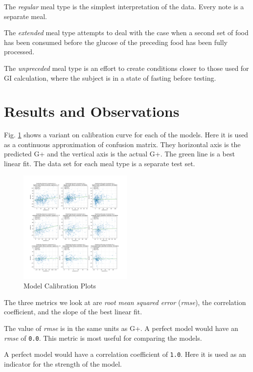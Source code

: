 \documentclass[conference]{IEEEtran}
\begin{document}
The \emph{regular} meal type is the simplest interpretation of the data. Every note is a separate meal.

The \emph{extended} meal type attempts to deal with the case when a second set of food has been consumed before the glucose of the preceding food has been fully processed.

The \emph{unpreceded} meal type is an effort to create conditions closer to those used for GI calculation, where the subject is in a state of fasting before testing.

\section{Results and Observations}

Fig. \ref{fig:all_models_tested} shows a variant on calibration curve for each of the models. Here it is used as a continuous approximation of confusion matrix. They horizontal axis is the predicted G+ and the vertical axis is the actual G+. The green line is a best linear fit. The data set for each meal type is a separate test set.

\begin{figure}[tbp]
    \includegraphics[width=0.5\textwidth]{images/gplus_all_models.png}
    \caption{Model Calibration Plots}
    \label{fig:all_models_tested}
\end{figure}

The three metrics we look at are \emph{root mean squared error} (\emph{rmse}), the correlation coefficient, and the slope of the best linear fit.

The value of \emph{rmse} is in the same units as G+. A perfect model would have an \emph{rmse} of \texttt{0.0}. This metric is most useful for comparing the models.

A perfect model would have a correlation coefficient of \texttt{1.0}. Here it is used as an indicator for the strength of the model.
\end{document}

